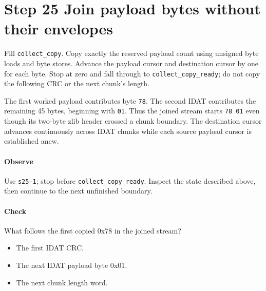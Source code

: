 \section{Step 25 Join payload bytes without their envelopes}\label{png-collect-s25}
Fill \texttt{collect\_copy}. Copy exactly the reserved payload count using unsigned byte loads and byte stores. Advance the payload cursor and destination cursor by one for each byte. Stop at zero and fall through to \texttt{collect\_copy\_ready}; do not copy the following CRC or the next chunk's length.

The first worked payload contributes byte \texttt{78}. The second IDAT contributes the remaining 45 bytes, beginning with \texttt{01}. Thus the joined stream starts \texttt{78 01} even though its two-byte zlib header crossed a chunk boundary. The destination cursor advances continuously across IDAT chunks while each source payload cursor is established anew.

\paragraph{Observe} Use \texttt{s25-1}; stop before \texttt{collect\_copy\_ready}. Inspect the state described above, then continue to the next unfinished boundary.

\paragraph{Check} What follows the first copied 0x78 in the joined stream?
\begin{itemize}
  \item[A.] The first IDAT CRC.
  \item[B.] The next IDAT payload byte 0x01.
  \item[C.] The next chunk length word.
\end{itemize}
